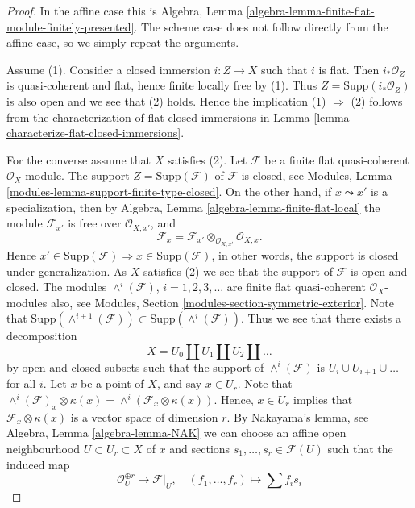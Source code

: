 \documentclass[10pt,a4paper]{amsart}
\theoremstyle{plain}
\theoremstyle{definition}
\theoremstyle{remark}
\numberwithin{equation}{subsection}
\begin{document}
\begin{proof}
In the affine case this is
Algebra, Lemma \ref{algebra-lemma-finite-flat-module-finitely-presented}.
The scheme case does not follow directly from the affine case, so we
simply repeat the arguments.

\medskip\noindent
Assume (1). Consider a closed immersion $i : Z \to X$ such that $i$ is flat.
Then $i_*\mathcal{O}_Z$ is quasi-coherent and flat, hence finite locally
free by (1). Thus $Z = \text{Supp}(i_*\mathcal{O}_Z)$ is also open and we see
that (2) holds. Hence the implication (1) $\Rightarrow$ (2) follows from
the characterization of flat closed immersions in
Lemma \ref{lemma-characterize-flat-closed-immersions}.

\medskip\noindent
For the converse assume that $X$ satisfies (2).
Let $\mathcal{F}$ be a finite flat quasi-coherent $\mathcal{O}_X$-module.
The support $Z = \text{Supp}(\mathcal{F})$ of $\mathcal{F}$ is closed, see
Modules, Lemma \ref{modules-lemma-support-finite-type-closed}.
On the other hand, if $x \leadsto x'$ is a specialization, then by
Algebra, Lemma \ref{algebra-lemma-finite-flat-local}
the module $\mathcal{F}_{x'}$ is free over $\mathcal{O}_{X, x'}$, and
$$
\mathcal{F}_x =
\mathcal{F}_{x'} \otimes_{\mathcal{O}_{X, x'}} \mathcal{O}_{X, x}.
$$
Hence
$x' \in \text{Supp}(\mathcal{F}) \Rightarrow x \in \text{Supp}(\mathcal{F})$,
in other words, the support is closed under generalization.
As $X$ satisfies (2) we see that the support of $\mathcal{F}$
is open and closed. The modules $\wedge^i(\mathcal{F})$, $i = 1, 2, 3, \ldots$
are finite flat quasi-coherent $\mathcal{O}_X$-modules
also, see
Modules, Section \ref{modules-section-symmetric-exterior}.
Note that
$\text{Supp}(\wedge^{i + 1}(\mathcal{F})) \subset
\text{Supp}(\wedge^i(\mathcal{F}))$.
Thus we see that there exists a decomposition
$$
X = U_0 \amalg U_1 \amalg U_2 \amalg \ldots
$$
by open and closed subsets such that the support of
$\wedge^i(\mathcal{F})$ is $U_i \cup U_{i + 1} \cup \ldots$ for all $i$.
Let $x$ be a point of $X$, and say $x \in U_r$.
Note that
$\wedge^i(\mathcal{F})_x \otimes \kappa(x) =
\wedge^i(\mathcal{F}_x \otimes \kappa(x))$.
Hence, $x \in U_r$ implies that $\mathcal{F}_x \otimes \kappa(x)$
is a vector space of dimension $r$. By Nakayama's lemma, see
Algebra, Lemma \ref{algebra-lemma-NAK}
we can choose an affine open neighbourhood $U \subset U_r \subset X$
of $x$ and sections $s_1, \ldots, s_r \in \mathcal{F}(U)$ such that
the induced map
$$
\mathcal{O}_U^{\oplus r} \longrightarrow \mathcal{F}|_U, \quad
(f_1, \ldots, f_r) \longmapsto \sum f_i s_i
$$
\end{proof}
\end{document}
